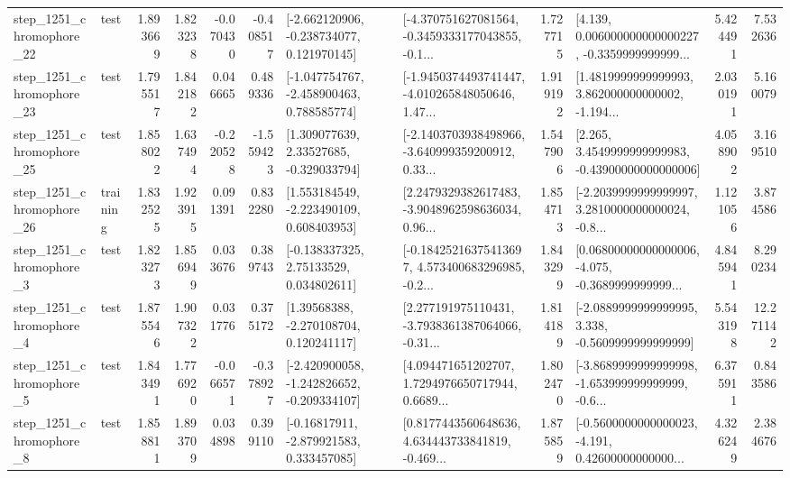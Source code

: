 \begin{tabular}{llrrrrllrlrr}
 step\_1251\_chromophore\_22 &      test &      1.893669 &    1.823238 &     -0.070430 & -0.408517 &   [-2.662120906, -0.238734077, 0.121970145] &  [-4.370751627081564, -0.3459333177043855, -0.1... &       1.727715 &  [4.139, 0.006000000000000227, -0.3359999999999... &            5.424491 &          7.532636 \\
 step\_1251\_chromophore\_23 &      test &      1.795517 &    1.842182 &      0.046665 &  0.489336 &   [-1.047754767, -2.458900463, 0.788585774] &  [-1.9450374493741447, -4.010265848050646, 1.47... &       1.919192 &  [1.4819999999999993, 3.862000000000002, -1.194... &            2.030191 &          5.160079 \\
 step\_1251\_chromophore\_25 &      test &      1.858022 &    1.637494 &     -0.220528 & -1.559423 &     [1.309077639, 2.33527685, -0.329033794] &  [-2.1403703938498966, -3.640999359200912, 0.33... &       1.547906 &  [2.265, 3.4549999999999983, -0.43900000000000006] &            4.058902 &          3.169510 \\
 step\_1251\_chromophore\_26 &  training &      1.832525 &    1.923915 &      0.091391 &  0.832280 &    [1.553184549, -2.223490109, 0.608403953] &  [2.2479329382617483, -3.9048962598636034, 0.96... &       1.854713 &  [-2.2039999999999997, 3.2810000000000024, -0.8... &            1.121056 &          3.874586 \\
  step\_1251\_chromophore\_3 &      test &      1.823273 &    1.856949 &      0.033676 &  0.389743 &     [-0.138337325, 2.75133529, 0.034802611] &  [-0.18425216375413697, 4.573400683296985, -0.2... &       1.843299 &  [0.06800000000000006, -4.075, -0.3689999999999... &            4.845941 &          8.290234 \\
  step\_1251\_chromophore\_4 &      test &      1.875546 &    1.907322 &      0.031776 &  0.375172 &     [1.39568388, -2.270108704, 0.120241117] &  [2.277191975110431, -3.7938361387064066, -0.31... &       1.814189 &  [-2.0889999999999995, 3.338, -0.5609999999999999] &            5.543198 &         12.271142 \\
  step\_1251\_chromophore\_5 &      test &      1.843491 &    1.776920 &     -0.066571 & -0.378927 &  [-2.420900058, -1.242826652, -0.209334107] &  [4.094471651202707, 1.7294976650717944, 0.6689... &       1.802470 &  [-3.8689999999999998, -1.653999999999999, -0.6... &            6.375911 &          0.843586 \\
  step\_1251\_chromophore\_8 &      test &      1.858811 &    1.893709 &      0.034898 &  0.399110 &    [-0.16817911, -2.879921583, 0.333457085] &  [0.8177443560648636, 4.634443733841819, -0.469... &       1.875859 &  [-0.5600000000000023, -4.191, 0.42600000000000... &            4.326249 &          2.384676 \\

\end{tabular}
